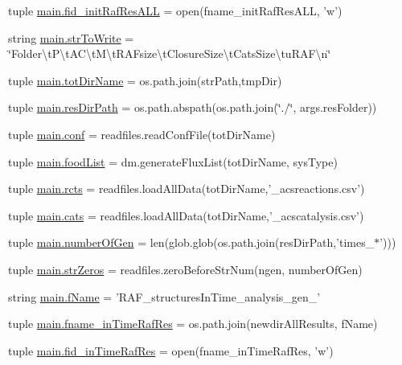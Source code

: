 \begin{DoxyCompactItemize}
\item 
tuple \hyperlink{a00117_a45aeb03f0d9cc30cb0a490354fd76d6c}{main.\-fid\-\_\-init\-Raf\-Res\-A\-L\-L} = open(fname\-\_\-init\-Raf\-Res\-A\-L\-L, 'w')
\item 
string \hyperlink{a00117_ab9980383a541b03ce91d6b812a4bf79a}{main.\-str\-To\-Write} = \char`\"{}Folder\textbackslash{}t\-P\textbackslash{}t\-A\-C\textbackslash{}t\-M\textbackslash{}t\-R\-A\-Fsize\textbackslash{}t\-Closure\-Size\textbackslash{}t\-Cats\-Size\textbackslash{}tu\-R\-A\-F\textbackslash{}n\char`\"{}
\item 
tuple \hyperlink{a00117_a82f73a786e4c93e909fd689ee0d0812e}{main.\-tot\-Dir\-Name} = os.\-path.\-join(str\-Path,tmp\-Dir)
\item 
tuple \hyperlink{a00117_a93d7d68ada532b3cedaab103283ab91a}{main.\-res\-Dir\-Path} = os.\-path.\-abspath(os.\-path.\-join(\char`\"{}./\char`\"{}, args.\-res\-Folder))
\item 
tuple \hyperlink{a00117_adc567db25548116293968a9102beab98}{main.\-conf} = readfiles.\-read\-Conf\-File(tot\-Dir\-Name)
\item 
tuple \hyperlink{a00117_a07ce1f0750b6dc5baff89792fc194152}{main.\-food\-List} = dm.\-generate\-Flux\-List(tot\-Dir\-Name, sys\-Type)
\item 
tuple \hyperlink{a00117_ac2fe1ed3228b8e616f25ccfbe4cc7dc4}{main.\-rcts} = readfiles.\-load\-All\-Data(tot\-Dir\-Name,'\-\_\-acsreactions.\-csv')
\item 
tuple \hyperlink{a00117_adc0282a6415a88834556e66807bcc800}{main.\-cats} = readfiles.\-load\-All\-Data(tot\-Dir\-Name,'\-\_\-acscatalysis.\-csv')
\item 
tuple \hyperlink{a00117_aabf82b9e9c2293000a67162becdd440d}{main.\-number\-Of\-Gen} = len(glob.\-glob(os.\-path.\-join(res\-Dir\-Path,'times\-\_\-$\ast$')))
\item 
tuple \hyperlink{a00117_a02d59015bebcf0ad1bc1162efca757c3}{main.\-str\-Zeros} = readfiles.\-zero\-Before\-Str\-Num(ngen, number\-Of\-Gen)
\item 
string \hyperlink{a00117_a9fff4b23f9489649601960dabc4a6cdd}{main.\-f\-Name} = 'R\-A\-F\-\_\-structures\-In\-Time\-\_\-analysis\-\_\-gen\-\_\-'
\item 
tuple \hyperlink{a00117_a64d742d069748ddd43a9378ef918d0b1}{main.\-fname\-\_\-in\-Time\-Raf\-Res} = os.\-path.\-join(newdir\-All\-Results, f\-Name)
\item 
tuple \hyperlink{a00117_ab82095abcedb97b7abf8e003f4724d0c}{main.\-fid\-\_\-in\-Time\-Raf\-Res} = open(fname\-\_\-in\-Time\-Raf\-Res, 'w')

\end{DoxyCompactItemize}
